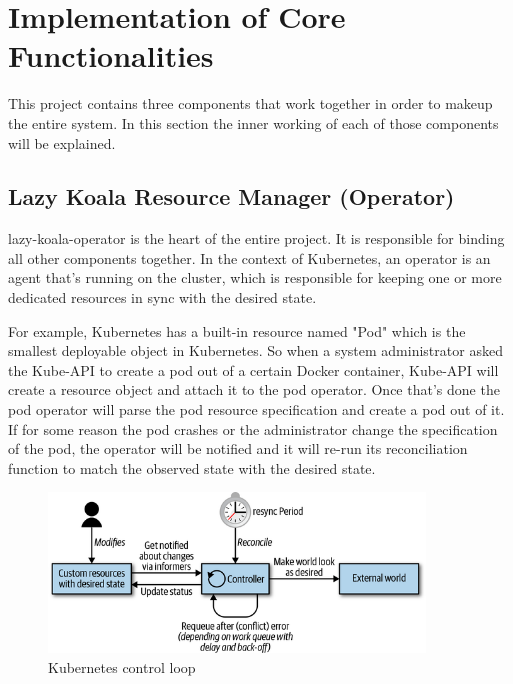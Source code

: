 \section{Implementation of Core Functionalities}

This project contains three components that work together in order to makeup the entire system. In this section the inner working of each of those components will be explained.

\subsection{Lazy Koala Resource Manager (Operator)}

\ac{lazy-koala-operator} is the heart of the entire project. It is responsible for binding all other components together. In the context of Kubernetes, an operator is an agent that's running on the cluster, which is responsible for keeping one or more dedicated resources in sync with the desired state. 

For example, Kubernetes has a built-in resource named "Pod" which is the smallest deployable object in Kubernetes. So when a system administrator asked the Kube-API to create a pod out of a certain Docker container, Kube-API will create a resource object and attach it to the pod operator. Once that's done the pod operator will parse the pod resource specification and create a pod out of it. If for some reason the pod crashes or the administrator change the specification of the pod, the operator will be notified and it will re-run its reconciliation function to match the observed state with the desired state.

\begin{figure}[H]
    \includegraphics[width=10cm]{assets/implementation/kubernetes-control-loop.png}
    \caption{Kubernetes control loop \citep{hausenblas2019programming}}
\end{figure}


